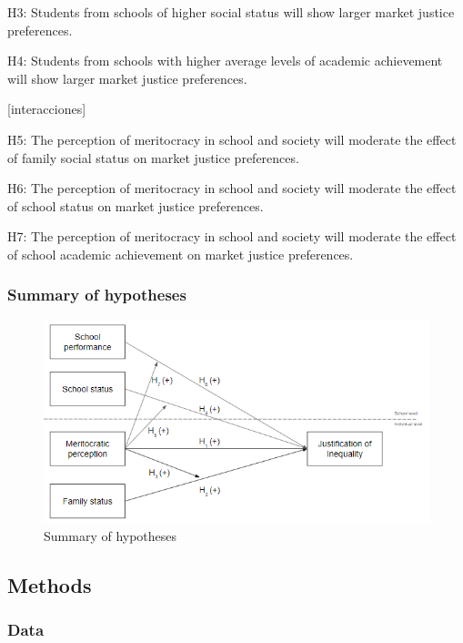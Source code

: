 \documentclass[
  letterpaper,
  DIV=11,
  numbers=noendperiod]{scrartcl}
\begin{document}
H3: Students from schools of higher social status will show larger
market justice preferences.

H4: Students from schools with higher average levels of academic
achievement will show larger market justice preferences.

{[}interacciones{]}

H5: The perception of meritocracy in school and society will moderate
the effect of family social status on market justice preferences.

H6: The perception of meritocracy in school and society will moderate
the effect of school status on market justice preferences.

H7: The perception of meritocracy in school and society will moderate
the effect of school academic achievement on market justice preferences.

\hypertarget{summary-of-hypotheses}{%
\subsubsection{Summary of hypotheses}\label{summary-of-hypotheses}}

\begin{figure}

{\centering \includegraphics[width=6.25in,height=\textheight]{input/img/hypotheses.png}

}

\caption{\label{fig-hypotheses}Summary of hypotheses}

\end{figure}

\hypertarget{methods}{%
\subsection{Methods}\label{methods}}

\hypertarget{data}{%
\subsubsection{Data}\label{data}}
\end{document}
